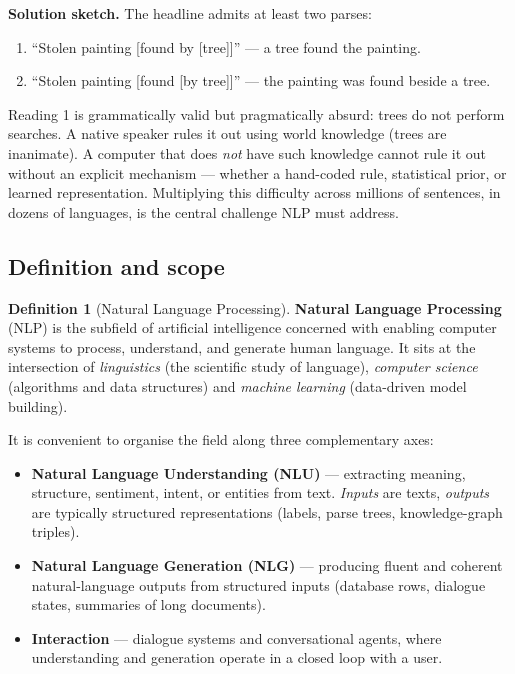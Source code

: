 \documentclass[12pt,a4paper]{report}
\theoremstyle{definition}
\newtheorem{definition}{Definition}[section]
\theoremstyle{remark}
\begin{document}
\textbf{Solution sketch.} The headline admits at least two parses:
\begin{enumerate}
    \item ``Stolen painting [found by [tree]]'' --- a tree found the painting.
    \item ``Stolen painting [found [by tree]]'' --- the painting was found beside a tree.
\end{enumerate}
Reading 1 is grammatically valid but pragmatically absurd: trees do not perform searches. A native speaker rules it out using world knowledge (trees are inanimate). A computer that does \emph{not} have such knowledge cannot rule it out without an explicit mechanism --- whether a hand-coded rule, statistical prior, or learned representation. Multiplying this difficulty across millions of sentences, in dozens of languages, is the central challenge NLP must address.

\subsection{Definition and scope}

\begin{definition}[Natural Language Processing]
\textbf{Natural Language Processing} (NLP) is the subfield of artificial intelligence concerned with enabling computer systems to process, understand, and generate human language. It sits at the intersection of \emph{linguistics} (the scientific study of language), \emph{computer science} (algorithms and data structures) and \emph{machine learning} (data-driven model building).
\end{definition}

It is convenient to organise the field along three complementary axes:

\begin{itemize}
    \item \textbf{Natural Language Understanding (NLU)} --- extracting meaning, structure, sentiment, intent, or entities from text. \emph{Inputs} are texts, \emph{outputs} are typically structured representations (labels, parse trees, knowledge-graph triples).
    \item \textbf{Natural Language Generation (NLG)} --- producing fluent and coherent natural-language outputs from structured inputs (database rows, dialogue states, summaries of long documents).
    \item \textbf{Interaction} --- dialogue systems and conversational agents, where understanding and generation operate in a closed loop with a user.
\end{itemize}
\end{document}
